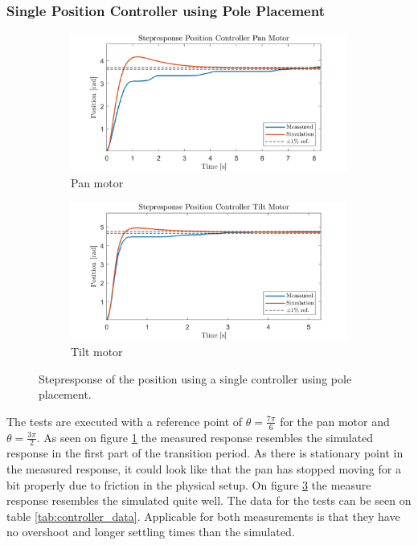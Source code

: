\documentclass[../../main.tex]{subfiles}
\begin{document}
\subsubsection*{Single Position Controller using Pole Placement}

\begin{figure}[h]
     \centering
     \begin{subfigure}[b]{0.49\textwidth}
         \centering
         \includegraphics[width=\textwidth]{Sections/Test/Images/StepPanPosModel.png}
         \caption{Pan motor}
         \label{fig:StepPanPos}
     \end{subfigure}
     \hfill
     \begin{subfigure}[b]{0.49\textwidth}
         \centering
         \includegraphics[width=\textwidth]{Sections/Test/Images/StepTiltPosModel.png}
         \caption{Tilt motor}
         \label{fig:StepTiltPos}
     \end{subfigure}
        \caption{Stepresponse of the position using a single controller using pole placement.}
        \label{fig:singlePosController}
\end{figure}
The tests are executed with a reference point of $\theta = \frac{7\pi}{6}$ for the pan motor and $\theta = \frac{3\pi}{2}$. As seen on figure \ref{fig:StepPanPos} the measured response resembles the simulated response in the first part of the transition period. As there is stationary point in the measured response, it could look like that the pan has stopped moving for a bit properly due to friction in the physical setup. On figure \ref{fig:singlePosController} the measure response resembles the simulated quite well. The data for the tests can be seen on table \ref{tab:controller_data}. Applicable for both measurements is that they have no overshoot and longer settling times than the simulated. 
\end{document}
